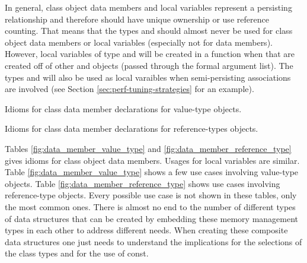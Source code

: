 \documentclass[pdf,ps2pdf,11pt]{SANDreport}
\begin{document}
In general, class object data members and local variables represent a
persisting relationship and therefore should have unique ownership or
use reference counting.  That means that the types {} and
{} should almost never be used for class object data
members or local variables (especially not for data members).
However, local variables of type {} and {}
will be created in a function when that are created off of other
{} and {} objects (passed through the formal
argument list).  The types {} and {} will also
be used as local varaibles when semi-persisting associations are
involved (see Section {}\ref{sec:perf-tuning-strategies} for an
example).


\begin{table}
%
\begin{center}
%
%

%
%
\end{center}
\caption{\label{fig:data_member_value_type}
Idioms for class data member declarations for value-type objects.}
%
\end{table}


\begin{table}
%
\begin{center}
%
%

%
%
\end{center}
\caption{\label{fig:data_member_reference_type}
Idioms for class data member declarations for reference-types
objects.}
%
\end{table}


Tables {}\ref{fig:data_member_value_type} and
{}\ref{fig:data_member_reference_type} gives idioms for class object
data members.  Usages for local variables are similar.  Table
{}\ref{fig:data_member_value_type} shows a few use cases involving
value-type objects.  Table {}\ref{fig:data_member_reference_type}
shows use cases involving reference-type objects.  Every possible use
case is not shown in these tables, only the most common ones.  There
is almost no end to the number of different types of data structures
that can be created by embedding these memory management types in each
other to address different needs.  When creating these composite data
structures one just needs to understand the implications for the
selections of the class types and for the use of const.
\end{document}
